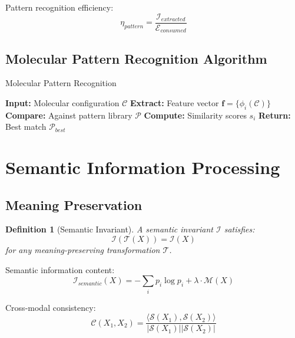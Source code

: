 \documentclass[12pt]{article}
\newtheorem{definition}[theorem]{Definition}
\begin{document}
Pattern recognition efficiency:
\begin{equation}
\eta_{pattern} = \frac{\mathcal{I}_{extracted}}{\mathcal{E}_{consumed}}
\end{equation}

\subsection{Molecular Pattern Recognition Algorithm}

\begin{algorithm}[H]
\caption{Molecular Pattern Recognition}
\begin{algorithmic}[1]
\State \textbf{Input:} Molecular configuration $\mathcal{C}$
\State \textbf{Extract:} Feature vector $\mathbf{f} = \{\phi_i(\mathcal{C})\}$
\State \textbf{Compare:} Against pattern library $\mathcal{P}$
\State \textbf{Compute:} Similarity scores $s_i$
\State \textbf{Return:} Best match $\mathcal{P}_{best}$
\end{algorithmic}
\end{algorithm}

\section{Semantic Information Processing}

\subsection{Meaning Preservation}

\begin{definition}[Semantic Invariant]
A semantic invariant $\mathcal{I}$ satisfies:
\begin{equation}
\mathcal{I}(\mathcal{T}(X)) = \mathcal{I}(X)
\end{equation}
for any meaning-preserving transformation $\mathcal{T}$.
\end{definition}

Semantic information content:
\begin{equation}
\mathcal{I}_{semantic}(X) = -\sum_i p_i \log p_i + \lambda \cdot \mathcal{M}(X)
\end{equation}

Cross-modal consistency:
\begin{equation}
\mathcal{C}(X_1, X_2) = \frac{\langle \mathcal{S}(X_1), \mathcal{S}(X_2) \rangle}{|\mathcal{S}(X_1)| |\mathcal{S}(X_2)|}
\end{equation}
\end{document}
